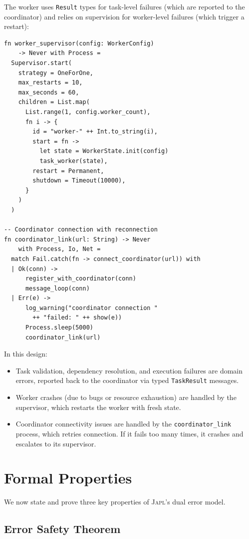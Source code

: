 \documentclass[11pt,twocolumn]{article}
\newcommand{\japl}{\textsc{Japl}}
\newcommand{\Result}{\texttt{Result}}
\begin{document}
The worker uses \Result{} types for task-level failures (which are reported to the coordinator) and relies on supervision for worker-level failures (which trigger a restart):

\begin{lstlisting}
fn worker_supervisor(config: WorkerConfig)
    -> Never with Process =
  Supervisor.start(
    strategy = OneForOne,
    max_restarts = 10,
    max_seconds = 60,
    children = List.map(
      List.range(1, config.worker_count),
      fn i -> {
        id = "worker-" ++ Int.to_string(i),
        start = fn ->
          let state = WorkerState.init(config)
          task_worker(state),
        restart = Permanent,
        shutdown = Timeout(10000),
      }
    )
  )

-- Coordinator connection with reconnection
fn coordinator_link(url: String) -> Never
    with Process, Io, Net =
  match Fail.catch(fn -> connect_coordinator(url)) with
  | Ok(conn) ->
      register_with_coordinator(conn)
      message_loop(conn)
  | Err(e) ->
      log_warning("coordinator connection "
        ++ "failed: " ++ show(e))
      Process.sleep(5000)
      coordinator_link(url)
\end{lstlisting}

In this design:
\begin{itemize}[leftmargin=*]
  \item Task validation, dependency resolution, and execution failures are domain errors, reported back to the coordinator via typed \texttt{TaskResult} messages.
  \item Worker crashes (due to bugs or resource exhaustion) are handled by the supervisor, which restarts the worker with fresh state.
  \item Coordinator connectivity issues are handled by the \texttt{coordinator\_link} process, which retries connection. If it fails too many times, it crashes and escalates to its supervisor.
\end{itemize}

\section{Formal Properties}\label{sec:formal-properties}

We now state and prove three key properties of \japl{}'s dual error model.

\subsection{Error Safety Theorem}
\end{document}
